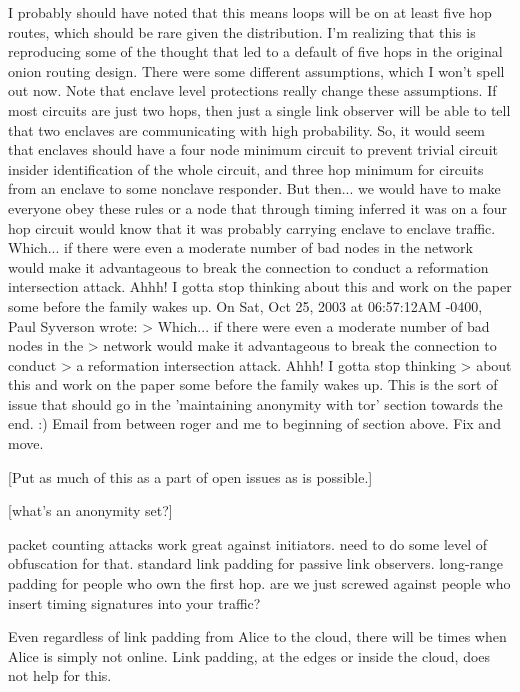 \documentclass[times,10pt,twocolumn]{article}
\begin{document}
I probably should have noted that this means loops will be on at least
five hop routes, which should be rare given the distribution.  I'm    
realizing that this is reproducing some of the thought that led to a  
default of five hops in the original onion routing design.  There were
some different assumptions, which I won't spell out now.  Note that   
enclave level protections really change these assumptions.  If most   
circuits are just two hops, then just a single link observer will be  
able to tell that two enclaves are communicating with high probability.
So, it would seem that enclaves should have a four node minimum circuit
to prevent trivial circuit insider identification of the whole circuit,
and three hop minimum for circuits from an enclave to some nonclave    
responder. But then... we would have to make everyone obey these rules 
or a node that through timing inferred it was on a four hop circuit    
would know that it was probably carrying enclave to enclave traffic.   
Which... if there were even a moderate number of bad nodes in the      
network would make it advantageous to break the connection to conduct  
a reformation intersection attack. Ahhh! I gotta stop thinking         
about this and work on the paper some before the family wakes up.  
On Sat, Oct 25, 2003 at 06:57:12AM -0400, Paul Syverson wrote:
> Which... if there were even a moderate number of bad nodes in the
> network would make it advantageous to break the connection to conduct         > a reformation intersection attack. Ahhh! I gotta stop thinking                > about this and work on the paper some before the family wakes up.             
This is the sort of issue that should go in the 'maintaining anonymity
with tor' section towards the end. :)
Email from between roger and me to beginning of section above. Fix and move.


[Put as much of this as a part of open issues as is possible.]

[what's an anonymity set?]

packet counting attacks work great against initiators. need to do some
level of obfuscation for that. standard link padding for passive link
observers. long-range padding for people who own the first hop. are
we just screwed against people who insert timing signatures into your
traffic?

Even regardless of link padding from Alice to the cloud, there will be
times when Alice is simply not online. Link padding, at the edges or
inside the cloud, does not help for this.
\end{document}
